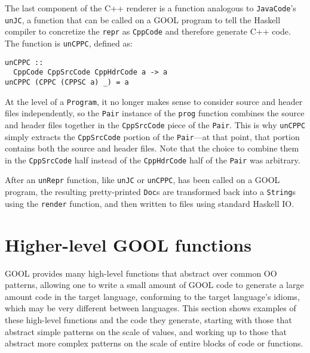 \documentclass[sigplan,review,anonymous,prologue,dvipsnames]{acmart}
\begin{document}
The last component of the C++ renderer is a function analogous to 
\verb|JavaCode|'s \verb|unJC|, a function that can be called on a GOOL program 
to tell the Haskell compiler to concretize the \verb|repr| as \verb|CppCode| 
and therefore generate C++ code. The function is \verb|unCPPC|, defined as:
\begin{lstlisting}
unCPPC :: 
  CppCode CppSrcCode CppHdrCode a -> a
unCPPC (CPPC (CPPSC a) _) = a
\end{lstlisting}
At the level of a \verb|Program|, it no longer makes sense to consider source 
and header files independently, so the \verb|Pair| instance of the \verb|prog| 
function combines the source and header files together in the \verb|CppSrcCode| 
piece of the \verb|Pair|. This is why \verb|unCPPC| simply extracts the 
\verb|CppSrcCode| portion of the \verb|Pair|---at that point, that portion 
contains both the source and header files. Note that the choice to combine them 
in the \verb|CppSrcCode| half instead of the \verb|CppHdrCode| half of the 
\verb|Pair| was arbitrary.

After an \verb|unRepr| function, like \verb|unJC| or \verb|unCPPC|, has been 
called on a GOOL program, the resulting pretty-printed \verb|Doc|s are 
transformed back into a \verb|String|s using the \verb|render| function, and 
then written to files using standard Haskell IO.

\section{Higher-level GOOL functions} \label{sec:patterns}

GOOL provides many high-level functions that abstract over common OO patterns, 
allowing one to write a small amount of GOOL code to generate a large amount 
code in the target language, conforming to the target language's idioms, which 
may be very different between languages. This section shows examples of these 
high-level functions and the code they generate, starting with those that 
abstract simple patterns on the scale of values, and working up to those that 
abstract more complex patterns on the scale of entire blocks of code or 
functions.
\end{document}
